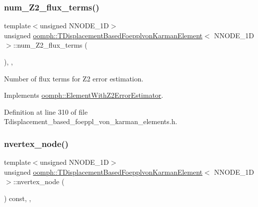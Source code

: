 \subsubsection{\texorpdfstring{num\+\_\+\+Z2\+\_\+flux\+\_\+terms()}{num\_Z2\_flux\_terms()}}
{\footnotesize\ttfamily template$<$unsigned N\+N\+O\+D\+E\+\_\+1D$>$ \\
unsigned \hyperlink{classoomph_1_1TDisplacementBasedFoepplvonKarmanElement}{oomph\+::\+T\+Displacement\+Based\+Foepplvon\+Karman\+Element}$<$ N\+N\+O\+D\+E\+\_\+1D $>$\+::num\+\_\+\+Z2\+\_\+flux\+\_\+terms (\begin{DoxyParamCaption}{ }\end{DoxyParamCaption})\hspace{0.3cm}{\ttfamily [inline]}, {\ttfamily [protected]}, {\ttfamily [virtual]}}



Number of \textquotesingle{}flux\textquotesingle{} terms for Z2 error estimation. 



Implements \hyperlink{classoomph_1_1ElementWithZ2ErrorEstimator_ae82c5728902e13da31be19c390fc28e3}{oomph\+::\+Element\+With\+Z2\+Error\+Estimator}.



Definition at line 310 of file Tdisplacement\+\_\+based\+\_\+foeppl\+\_\+von\+\_\+karman\+\_\+elements.\+h.

\mbox{\label{classoomph_1_1TDisplacementBasedFoepplvonKarmanElement_a8d0654116b55993bf68b640f74d4e4a4}} 
\subsubsection{\texorpdfstring{nvertex\+\_\+node()}{nvertex\_node()}}
{\footnotesize\ttfamily template$<$unsigned N\+N\+O\+D\+E\+\_\+1D$>$ \\
unsigned \hyperlink{classoomph_1_1TDisplacementBasedFoepplvonKarmanElement}{oomph\+::\+T\+Displacement\+Based\+Foepplvon\+Karman\+Element}$<$ N\+N\+O\+D\+E\+\_\+1D $>$\+::nvertex\+\_\+node (\begin{DoxyParamCaption}{ }\end{DoxyParamCaption}) const\hspace{0.3cm}{\ttfamily [inline]}, {\ttfamily [protected]}, {\ttfamily [virtual]}}



